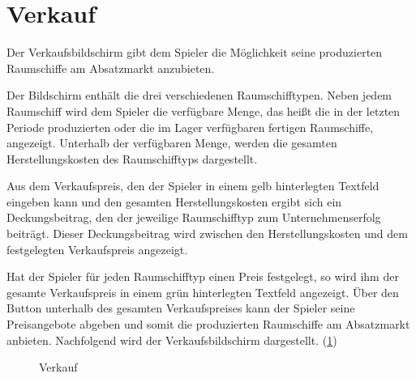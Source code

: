 \section{Verkauf}
\label{sec:ui-verkauf}

Der Verkaufsbildschirm gibt dem Spieler die Möglichkeit seine produzierten Raumschiffe am Absatzmarkt anzubieten.
 
Der Bildschirm enthält die drei verschiedenen Raumschifftypen. Neben jedem Raumschiff wird dem Spieler die verfügbare Menge, das heißt die in der letzten Periode produzierten oder die im Lager verfügbaren fertigen Raumschiffe, angezeigt. Unterhalb der verfügbaren Menge, werden die gesamten Herstellungskosten des Raumschifftyps dargestellt. 
 
Aus dem Verkaufspreis, den der Spieler in einem gelb hinterlegten Textfeld eingeben kann und den gesamten Herstellungskosten ergibt sich ein Deckungsbeitrag, den der jeweilige Raumschifftyp zum Unternehmenserfolg beiträgt. Dieser Deckungsbeitrag wird zwischen den Herstellungskosten und dem festgelegten Verkaufspreis angezeigt.
 
Hat der Spieler für jeden Raumschifftyp einen Preis festgelegt, so wird ihm der gesamte Verkaufspreis in einem grün hinterlegten Textfeld angezeigt. Über den Button unterhalb des gesamten Verkaufspreises kann der Spieler seine Preisangebote abgeben und somit die produzierten Raumschiffe am Absatzmarkt anbieten.  Nachfolgend wird der Verkaufsbildschirm dargestellt. (\ref{img:ui-verkauf})

\begin{figure}[h]
  \centering
  \caption{Verkauf}
  \label{img:ui-verkauf}
\end{figure}

\autorende{}